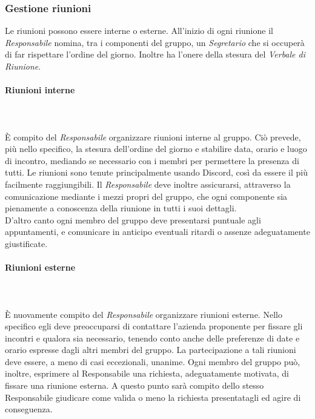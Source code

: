 \subsubsection{Gestione riunioni}
Le riunioni possono essere interne o esterne. All'inizio di ogni riunione il \textit{Responsabile} nomina, tra i componenti del gruppo, un \textit{Segretario} che si occuperà di far rispettare l'ordine del giorno. Inoltre ha l'onere della stesura del \textit{Verbale di Riunione}\glo.

\paragraph{Riunioni interne} \mbox{} \\ \mbox{} \\
È compito del \textit{Responsabile} organizzare riunioni interne al gruppo. Ciò prevede, più nello specifico, la stesura dell'ordine del giorno e
stabilire data, orario e luogo di incontro, mediando se necessario con i membri per permettere la presenza di tutti. Le riunioni sono tenute principalmente usando Discord, così da essere il più facilmente raggiungibili.
Il \textit{Responsabile} deve inoltre assicurarsi, attraverso la comunicazione
mediante i mezzi propri del gruppo, che ogni componente sia pienamente a conoscenza della riunione in tutti i suoi dettagli. \\
D'altro canto ogni membro del gruppo deve presentarsi puntuale agli appuntamenti,
e comunicare in anticipo eventuali ritardi o assenze adeguatamente giustificate.

\paragraph{Riunioni esterne} \mbox{} \\ \mbox{} \\
È nuovamente compito del \textit{Responsabile} organizzare riunioni esterne.
Nello specifico egli deve preoccuparsi di contattare l'azienda proponente per fissare gli
incontri e qualora sia necessario, tenendo conto anche delle preferenze di date e orario
espresse dagli altri membri del gruppo. La partecipazione a tali riunioni deve essere,
a meno di casi eccezionali, unanime.
Ogni membro del gruppo può, inoltre, esprimere al Responsabile una richiesta, adeguatamente motivata, di fissare una riunione esterna. A questo punto sarà compito
dello stesso Responsabile giudicare come valida o meno la richiesta presentatagli ed
agire di conseguenza.

